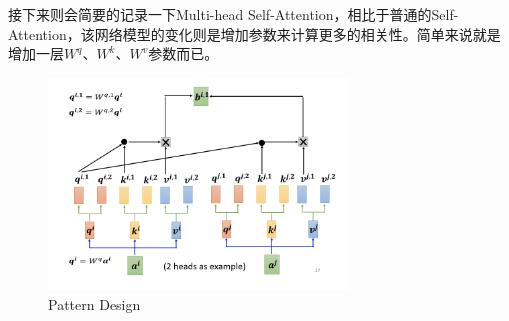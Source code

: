\documentclass{article}
\begin{document}
\indent 接下来则会简要的记录一下Multi-head Self-Attention，相比于普通的Self-Attention，该网络模型的变化则是增加参数来计算更多的相关性。简单来说就是增加一层\(W^{q}、W^{k}、W^{v}\)参数而已。 \par
\begin{figure}[H]
    \centering
    \includegraphics[width=8cm]{picture/MultiHeadAttention.png}
    \caption{Pattern Design}
    \label{fig:galxy}
\end{figure}

\end{document}

